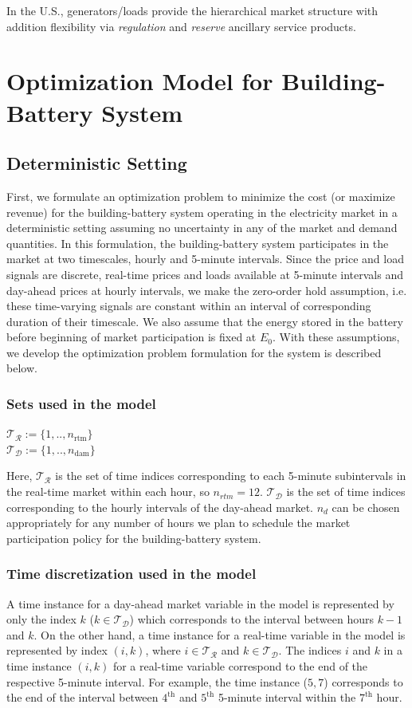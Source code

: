\documentclass[11pt,twoside]{article}
\begin{document}
In the U.S., generators/loads provide the hierarchical market structure with addition flexibility via \emph{regulation} and \emph{reserve} ancillary service products. 

\section{Optimization Model for Building-Battery System}\label{sec:model}
\subsection{Deterministic Setting}\label{subsec:deterministic}
First, we formulate an optimization problem to minimize the cost (or maximize revenue) for the building-battery system operating in the electricity market in a deterministic setting assuming no uncertainty in any of the market and demand quantities. In this formulation, the building-battery system participates in the market at two timescales, hourly and 5-minute intervals. Since the price and load signals are discrete, real-time prices and loads available at 5-minute intervals and day-ahead prices at hourly intervals, we make the zero-order hold assumption, i.e. these time-varying signals are constant within an interval of corresponding duration of their timescale. We also assume that the energy stored in the battery before beginning of market participation is fixed at $E_{0}$. With these assumptions, we develop the optimization problem formulation for the system is described below.
\subsubsection{Sets used in the model}
\begin{center}
$\mathcal{T_R} := \{1,..,n_{\textrm{rtm}}\}$\\$ \mathcal{T_D} :=  \{1,..,n_{\textrm{dam}}\}$
\end{center}
Here, $\mathcal{T_R}$ is the set of time indices corresponding to each 5-minute subintervals in the real-time market within each hour, so $n_{rtm}=12$. $\mathcal{T_D}$ is the set of time indices corresponding to the hourly intervals of the day-ahead market. $n_d$ can be chosen appropriately for any number of hours we plan to schedule the market participation policy for the building-battery system.
\subsubsection{Time discretization used in the model}
A time instance for a day-ahead market variable in the model is represented by only the index $k$ ($k \in \mathcal{T_D}$) which corresponds to the interval between hours $k-1$ and $k$. On the other hand, a time instance for a real-time variable in the model is represented by index $(i,k)$, where $i \in \mathcal{T_R}$ and $ k \in \mathcal{T_D}$. The indices $i$ and $k$ in a time instance $(i,k)$ for a real-time variable correspond to the end of the respective 5-minute interval. For example, the time instance ($5,7$) corresponds to the end of the interval between $4^{\text{th}}$ and $5^{\text{th}}$ 5-minute interval within the $7^\textrm{th}$ hour. 
\end{document}
